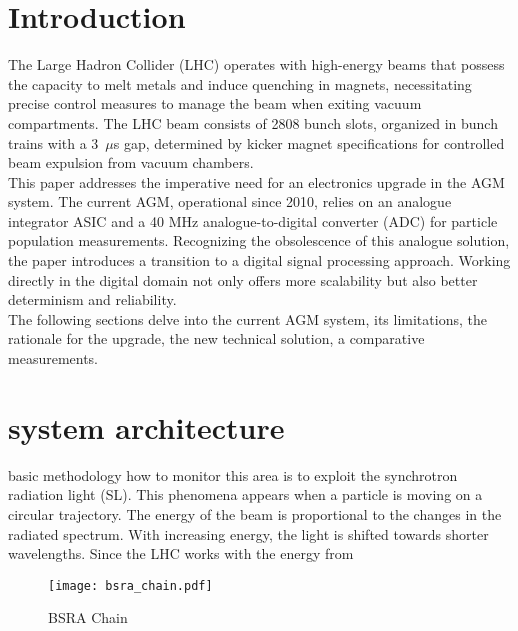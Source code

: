 \section{Introduction}
The Large Hadron Collider (LHC) operates with high-energy beams that possess
the capacity to melt metals and induce quenching in magnets, necessitating
precise control measures to manage the beam when exiting vacuum compartments.
The LHC beam consists of 2808 bunch slots, organized in bunch trains with a
3~$\mu$s gap, determined by kicker magnet specifications for controlled
beam expulsion from vacuum chambers.\\
This paper addresses the imperative need for an electronics upgrade in the AGM
system. The current AGM, operational since 2010, relies on an analogue
integrator ASIC and a 40 MHz analogue-to-digital converter (ADC) for particle
population measurements. Recognizing the obsolescence of this analogue
solution, the paper introduces a transition to a digital signal processing
approach. Working directly in the digital domain not only offers more
scalability but also better determinism and reliability.\\
The following sections delve into the current AGM system, its limitations, the
rationale for the upgrade, the new technical solution, a comparative
measurements.


\section{system architecture}
basic methodology how to monitor this area is to exploit the synchrotron
radiation light (SL). This phenomena appears when a particle is moving on a
circular trajectory. The energy of the beam is proportional to the changes in
the radiated spectrum. With increasing energy, the light is shifted towards
shorter wavelengths. Since the LHC works with the energy from 
\begin{figure}[!tbh]
    \centering
    \texttt{[image: bsra\_chain.pdf]}
    \caption{BSRA Chain}
    \label{fig:bsra_chain}
\end{figure}


